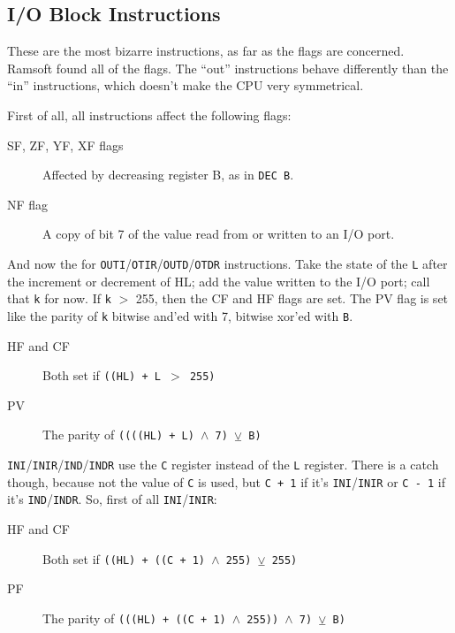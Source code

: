 \pagebreak
\subsection{I/O Block Instructions}
\label{block_io}

These are the most bizarre instructions, as far as the flags are concerned. Ramsoft found all of the flags. The ``out'' instructions behave differently than the ``in'' instructions, which doesn't make the CPU very symmetrical. 

First of all, all instructions affect the following flags:

\begin{description}

	\item[SF, ZF, YF, XF flags]
	Affected by decreasing register B, as in {\tt DEC B}.

	\item[NF flag]
	A copy of bit 7 of the value read from or written to an I/O port.

\end{description}

And now the for {\tt OUTI}/{\tt OTIR}/{\tt OUTD}/{\tt OTDR} instructions. Take the state of the {\tt L} after the increment or decrement of HL; add the value written to the I/O port; call that {\tt k} for now. If {\tt k} $>$ 255, then the CF and HF flags are set. The PV flag is set like the parity of {\tt k} bitwise and'ed with 7, bitwise xor'ed with {\tt B}.

\begin{description}

	\item[HF and CF]
	Both set if {\tt ((HL) + L  $>$ 255)}

	\item[PV]
	The parity of {\tt ((((HL) + L) $\wedge$ 7) $\veebar$ B)}

\end{description}

{\tt INI}/{\tt INIR}/{\tt IND}/{\tt INDR} use the {\tt C} register instead of the {\tt L} register. There is a catch though, because not the value of {\tt C} is used, but {\tt C + 1} if it's {\tt INI}/{\tt INIR} or {\tt C - 1} if it's {\tt IND}/{\tt INDR}. So, first of all {\tt INI}/{\tt INIR}:

\begin{description}

	\item[HF and CF]
	Both set if {\tt ((HL) + ((C + 1) $\wedge$ 255)  $\veebar$ 255)}

	\item[PF]
	The parity of {\tt (((HL) + ((C + 1) $\wedge$ 255)) $\wedge$ 7) $\veebar$ B)}

\end{description}

